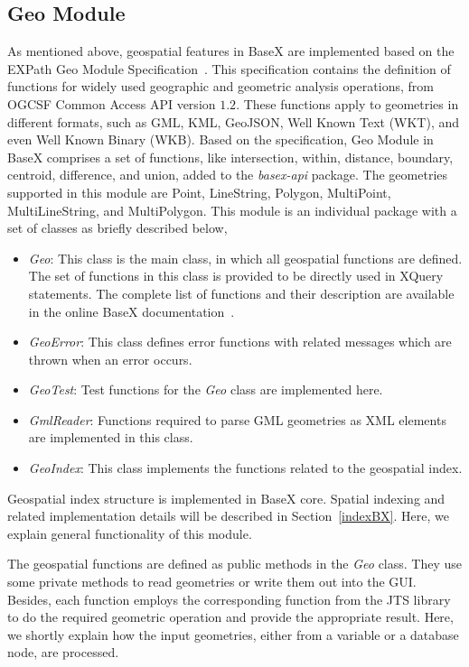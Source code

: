 \documentclass[a4paper,12pt]{article}
\begin{document}
\subsection{Geo Module}
\label{geomodule}
As mentioned above, geospatial features in BaseX are implemented based on the EXPath Geo Module Specification~\cite{expath}. This specification contains the definition of functions for widely used geographic and geometric analysis operations, from OGCSF Common Access API version $1.2$. These functions apply to geometries in different formats, such as GML, KML, GeoJSON, Well Known Text (WKT), and even Well Known Binary (WKB). Based on the specification, Geo Module in BaseX comprises a set of functions, like intersection, within, distance, boundary, centroid, difference, and union, added to the \textit{basex-api} package. The geometries supported in this module are Point, LineString, Polygon, MultiPoint, MultiLineString, and MultiPolygon. This module is an individual package with a set of classes as briefly described below,
\begin{itemize}
\item \textit{Geo}: This class is the main class, in which all geospatial functions are defined. The set of functions in this class is provided to be directly used in XQuery statements. The complete list of functions and their description are available in the online BaseX documentation~\cite{basexgeo}.
\item \textit{GeoError}: This class defines error functions with related messages which are thrown when an error occurs.
\item \textit{GeoTest}: Test functions for the \textit{Geo} class are implemented here.
\item \textit{GmlReader}: Functions required to parse GML geometries as XML elements are implemented in this class.
\item \textit{GeoIndex}: This class implements the functions related to the geospatial index. 
\end{itemize}

Geospatial index structure is implemented in BaseX core. Spatial indexing and related implementation details will be described in Section~\ref{indexBX}. Here, we explain general functionality of this module.

The geospatial functions are defined as public methods in the \textit{Geo} class. They use some private methods to read geometries or write them out into the GUI. Besides, each function employs the corresponding function from the JTS library to do the required geometric operation and provide the appropriate result. Here, we shortly explain how the input geometries, either from a variable or a database node, are processed.
\end{document}
